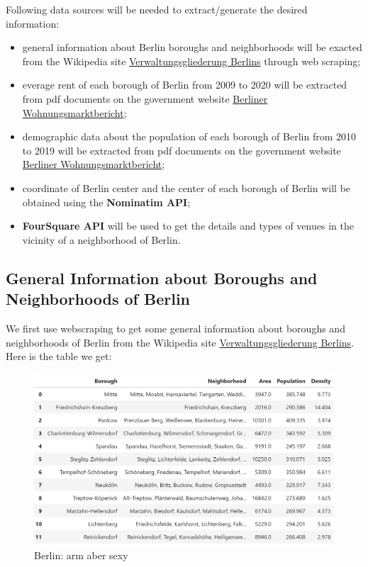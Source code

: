 \documentclass[11pt]{article}
\begin{document}
Following data sources will be needed to extract/generate the desired
information: 
\begin{itemize} 
    \item general information about Berlin boroughs and
neighborhoods will be exacted from the Wikipedia site
\href{https://de.wikipedia.org/wiki/Verwaltungsgliederung_Berlins}{Verwaltungsgliederung
Berlins} through web scraping; 
   \item everage rent of each borough of Berlin
from 2009 to 2020 will be extracted from pdf documents on the government
website
\href{https://www.stadtentwicklung.berlin.de/wohnen/wohnungsmarktbericht/}{Berliner
Wohnungsmarktbericht}; 
   \item demographic data about the population of each
borough of Berlin from 2010 to 2019 will be extracted from pdf documents
on the government website
\href{https://www.stadtentwicklung.berlin.de/wohnen/wohnungsmarktbericht/}{Berliner
Wohnungsmarktbericht}; 
   \item coordinate of Berlin center and the center of
each borough of Berlin will be obtained using the \textbf{Nominatim
API}; 
   \item \textbf{FourSquare API} will be used to get the details and
types of venues in the vicinity of a neighborhood of Berlin.
\end{itemize}

    \hypertarget{general-information-about-boroughs-and-neighborhoods-of-berlin}{%
\subsection{General Information about Boroughs and Neighborhoods of
Berlin}\label{general-information-about-boroughs-and-neighborhoods-of-berlin}}

We first use webscraping to get some general information about
boroughs and neighborhoods of Berlin from the Wikipedia site
\href{https://de.wikipedia.org/wiki/Verwaltungsgliederung_Berlins}{Verwaltungsgliederung
Berlins}. Here is the table we get:

  \begin{figure}
\centering
\includegraphics[width=16.5cm]{"Screenshot (27).png"}
\caption{Berlin: arm aber sexy}
\end{figure}
\end{document}
